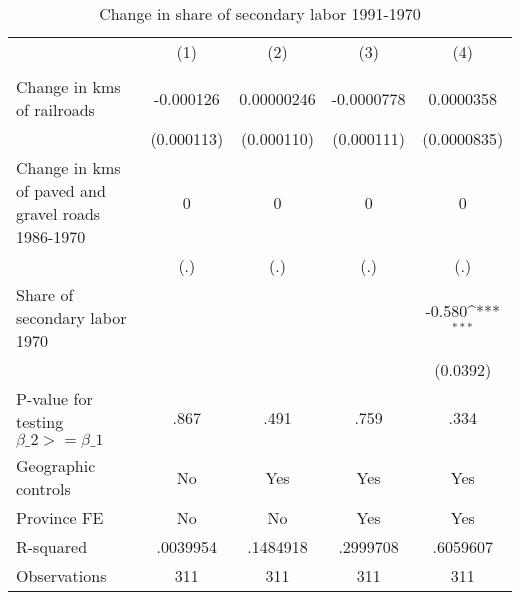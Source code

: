 \begin{table}[htbp]\centering
\def\sym#1{\ifmmode^{#1}\else\(^{#1}\)\fi}
\caption{Change in share of secondary labor 1991-1970}
\begin{tabular}{l*{4}{c}}
\hline\hline
                &\multicolumn{1}{c}{(1)}&\multicolumn{1}{c}{(2)}&\multicolumn{1}{c}{(3)}&\multicolumn{1}{c}{(4)}\\
                &\multicolumn{1}{c}{}&\multicolumn{1}{c}{}&\multicolumn{1}{c}{}&\multicolumn{1}{c}{}\\
\hline
Change in kms of railroads&-0.000126         &0.00000246         &-0.0000778         &0.0000358         \\
                &(0.000113)         &(0.000110)         &(0.000111)         &(0.0000835)         \\
[1em]
Change in kms of paved and gravel roads 1986-1970&        0         &        0         &        0         &        0         \\
                &      (.)         &      (.)         &      (.)         &      (.)         \\
[1em]
Share of secondary labor 1970&                  &                  &                  &   -0.580\sym{***}\\
                &                  &                  &                  & (0.0392)         \\
\hline
P-value for testing $\beta\_{2} >= \beta\_{1}$&     .867         &     .491         &     .759         &     .334         \\
Geographic controls&       No         &      Yes         &      Yes         &      Yes         \\
Province FE     &       No         &       No         &      Yes         &      Yes         \\
R-squared       & .0039954         & .1484918         & .2999708         & .6059607         \\
Observations    &      311         &      311         &      311         &      311         \\
\hline\hline
\end{tabular}
\end{table}
